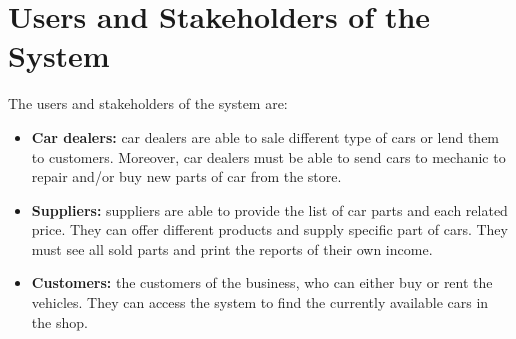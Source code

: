 \section{Users and Stakeholders of the System}
The users and stakeholders of the system are:

\begin{itemize}
	\item \textbf{Car dealers:} car dealers are able to sale different type of cars or lend them to customers. 
	Moreover, car dealers must be able to send cars to mechanic to repair and/or buy new parts of car from the store.
	\item \textbf{Suppliers:} suppliers are able to provide the list of car parts and each related price. 
	They can offer different products and supply specific part of cars. They must see all sold parts and print the 
	reports of their own income.
	\item \textbf{Customers:} the customers of the business, who can either buy or rent the vehicles. 
	They can access the system to find the currently available cars in the shop.
\end{itemize}